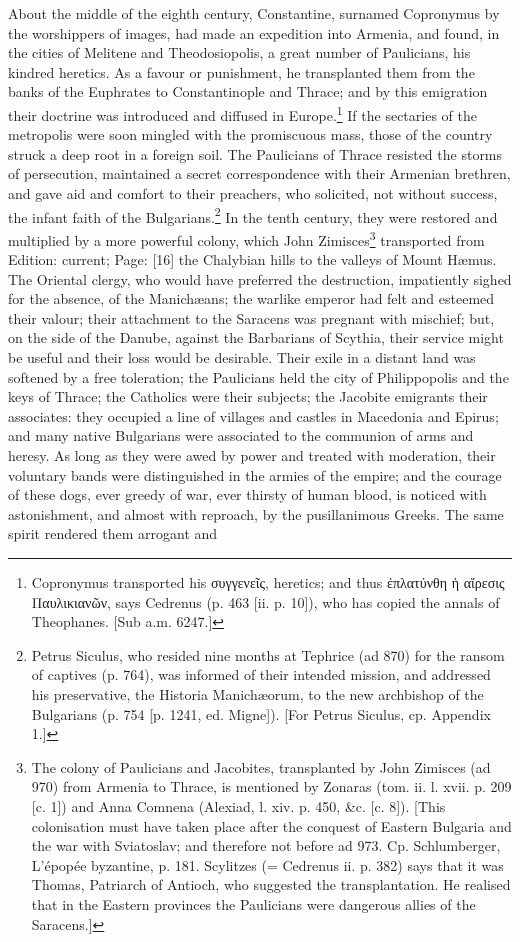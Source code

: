 About the middle of the eighth century, Constantine, surnamed Copronymus by the worshippers of images, had made an expedition into Armenia, and found, in the cities of Melitene and Theodosiopolis, a great number of Paulicians, his kindred heretics. As a favour or punishment, he transplanted them from the banks of the Euphrates to Constantinople and Thrace; and by this emigration their doctrine was introduced and diffused in Europe.\footnote{Copronymus transported his \textgreek{συγγενε\texthebrew{ῖ}ς}, heretics; and thus \textgreek{\texthebrew{ἐ}πλατύνθη \texthebrew{ἡ} α\texthebrew{ἴ}ρεσις Παυλικιαν\texthebrew{ῶ}ν}, says Cedrenus (p. 463 [ii. p. 10]), who has copied the annals of Theophanes. [Sub a.m. 6247.]} If the sectaries of the metropolis were soon mingled with the promiscuous mass, those of the country struck a deep root in a foreign soil. The Paulicians of Thrace resisted the storms of persecution, maintained a secret correspondence with their Armenian brethren, and gave aid and comfort to their preachers, who solicited, not without success, the infant faith of the Bulgarians.\footnote{Petrus Siculus, who resided nine months at Tephrice (ad 870) for the ransom of captives (p. 764), was informed of their intended mission, and addressed his preservative, the Historia Manichæorum, to the new archbishop of the Bulgarians (p. 754 [p. 1241, ed. Migne]). [For Petrus Siculus, cp. Appendix 1.]} In the tenth century, they were restored and multiplied by a more powerful colony, which John Zimisces\footnote{The colony of Paulicians and Jacobites, transplanted by John Zimisces (ad 970) from Armenia to Thrace, is mentioned by Zonaras (tom. ii. l. xvii. p. 209 [c. 1]) and Anna Comnena (Alexiad, l. xiv. p. 450, \&c. [c. 8]). [This colonisation must have taken place after the conquest of Eastern Bulgaria and the war with Sviatoslav; and therefore not before ad 973. Cp. Schlumberger, L\texthebrew{}’épopée byzantine, p. 181. Scylitzes (= Cedrenus ii. p. 382) says that it was Thomas, Patriarch of Antioch, who suggested the transplantation. He realised that in the Eastern provinces the Paulicians were dangerous allies of the Saracens.]} transported from Edition: current; Page: [16] the Chalybian hills to the valleys of Mount Hæmus. The Oriental clergy, who would have preferred the destruction, impatiently sighed for the absence, of the Manichæans; the warlike emperor had felt and esteemed their valour; their attachment to the Saracens was pregnant with mischief; but, on the side of the Danube, against the Barbarians of Scythia, their service might be useful and their loss would be desirable. Their exile in a distant land was softened by a free toleration; the Paulicians held the city of Philippopolis and the keys of Thrace; the Catholics were their subjects; the Jacobite emigrants their associates: they occupied a line of villages and castles in Macedonia and Epirus; and many native Bulgarians were associated to the communion of arms and heresy. As long as they were awed by power and treated with moderation, their voluntary bands were distinguished in the armies of the empire; and the courage of these dogs, ever greedy of war, ever thirsty of human blood, is noticed with astonishment, and almost with reproach, by the pusillanimous Greeks. The same spirit rendered them arrogant and 
